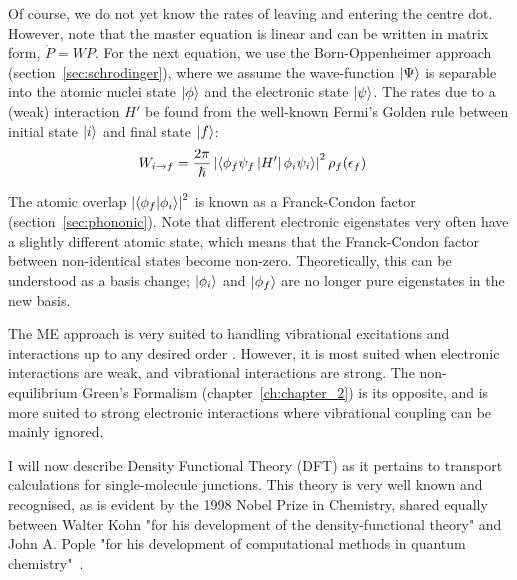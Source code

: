 Of course, we do not yet know the rates of leaving and entering the centre dot. However, note that the master equation is linear and can be written in matrix form, $\dot{P} = W P$. For the next equation, we use the Born-Oppenheimer approach (section~\ref{sec:schrodinger}), where we assume the wave-function $\ket{\Psi}$ is separable into the atomic nuclei state $\ket{\phi}$ and the electronic state $\ket{\psi}$. The rates due to a (weak) interaction $H'$ be found from the well-known Fermi's Golden rule between initial state $\ket{i}$ and final state $\ket{f}$:
\begin{align*}
W_{i\rightarrow f} &= \frac{2\pi}{\hslash} \left| \braket{\phi_f \psi_f \left|H'\right| \phi_i \psi_i}\right|^2 \rho_f (\epsilon_f)
\end{align*}

The atomic overlap $\left| \braket{ \phi_f | \phi_i }\right|^2$ is known as a Franck-Condon factor (section~\ref{sec:phononic}). Note that different electronic eigenstates very often have a slightly different atomic state, which means that the Franck-Condon factor between non-identical states become non-zero. Theoretically, this can be understood as a basis change; $\ket{\phi_i}$ and $\ket{\phi_f}$ are no longer pure eigenstates in the new basis. 

The ME approach is very suited to handling vibrational excitations and interactions up to any desired order \cite{seldenthuis}. However, it is most suited when electronic interactions are weak, and vibrational interactions are strong. The non-equilibrium Green's Formalism (chapter~\ref{ch:chapter_2}) is its opposite, and is more suited to strong electronic interactions where vibrational coupling can be mainly ignored. 

I will now describe Density Functional Theory (DFT) as it pertains to transport calculations for single-molecule junctions. This theory is very well known and recognised, as is evident by the 1998 Nobel Prize in Chemistry, shared equally between Walter Kohn "for his development of the density-functional theory" and John A. Pople "for his development of computational methods in quantum chemistry"~\cite{nobel1998}. 

